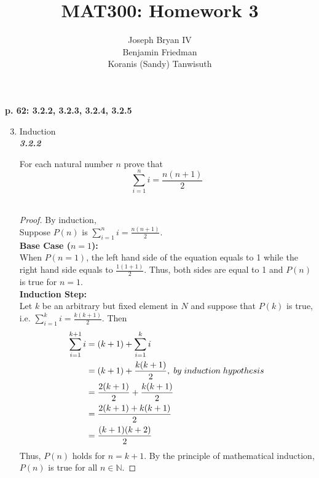 \documentclass{article}
\begin{document}
\title{MAT300: Homework 3}
\author{
	Joseph Bryan IV\\
	Benjamin Friedman\\
	Koranis (Sandy) Tanwisuth
}

\maketitle
	\begin{flushleft}
		\textbf{p. 62: 3.2.2, 3.2.3, 3.2.4, 3.2.5}
	\begin{enumerate}
		\setcounter{enumi}{2}
		\item Induction \\
		
		\textbf{\textit{3.2.2}}
		\begin{flushleft}
			For each natural number $n$ prove that 
			\begin{equation}\label{eq1}
				\sum_{i=1}^{n} i = \frac{n(n+1)}{2}
			\end{equation}
			\\
			\begin{proof}
				By induction, \\
				Suppose $P(n)$ is $\sum_{i=1}^{n} i = \frac{n(n+1)}{2}$. \\
				\textbf{Base Case ($n = 1$):}
				\\ When $P(n=1)$, the left hand side of the equation equals to 1 while the right hand side equals to $\frac{1(1+1)}{2}$. Thus, both sides are equal to 1 and $P(n)$ is true for $n=1$.
				\\
				\textbf{Induction Step:}
				\\
				Let $k$ be an arbitrary but fixed element in $N$ and suppose that $P(k)$ is true, i.e. $\sum_{i=1}^{k} i = \frac{k(k+1)}{2}$. Then
				\begin{align*}
					\sum_{i=1}^{k+1} i & = (k+1) + \sum_{i=1}^{k} i \\
					& = (k+1) + \frac{k(k+1)}{2}, \thickspace by \thickspace induction \thickspace hypothesis \\
					& = \frac{2(k+1)}{2} + \frac{k(k+1)}{2} \\
					& = \frac{2(k+1)+k(k+1)}{2} \\
					& = \frac{(k+1)(k+2)}{2}
				\end{align*}
				Thus, $P(n)$ holds for $n=k+1$. 
				By the principle of mathematical induction, $P(n)$ is true for all $n \in \mathbb{N}$.
			\end{proof}
			

\end{flushleft}
\end{enumerate}
\end{flushleft}
\end{document}
